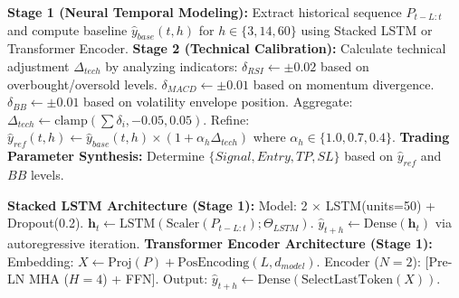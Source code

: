 \documentclass{ieeeaccess}
\begin{document}
\begin{itemize}
    \begin{breakablealgorithm}
    \caption{PricePredictor pipeline}
    \begin{algorithmic}[1]
    \STATE \textbf{Stage 1 (Neural Temporal Modeling):} 
    \STATE \quad Extract historical sequence $P_{t-L:t}$ and compute baseline $\hat{y}_{base}(t,h)$ for $h \in \{3,14,60\}$ using Stacked LSTM or Transformer Encoder.
    \STATE \textbf{Stage 2 (Technical Calibration):}
    \STATE \quad Calculate technical adjustment $\Delta_{tech}$ by analyzing indicators:
    \STATE \quad \hspace{0.5em} $\delta_{RSI} \gets \pm 0.02$ based on overbought/oversold levels.
    \STATE \quad \hspace{0.5em} $\delta_{MACD} \gets \pm 0.01$ based on momentum divergence.
    \STATE \quad \hspace{0.5em} $\delta_{BB} \gets \pm 0.01$ based on volatility envelope position.
    \STATE \quad Aggregate: $\Delta_{tech} \gets \text{clamp}(\sum \delta_i, -0.05, 0.05)$.
    \STATE \quad Refine: $\hat{y}_{ref}(t,h) \gets \hat{y}_{base}(t,h) \times (1 + \alpha_h \Delta_{tech})$ where $\alpha_h \in \{1.0, 0.7, 0.4\}$.
    \STATE \textbf{Trading Parameter Synthesis:}
    \STATE \quad Determine $\{Signal, Entry, TP, SL\}$ based on $\hat{y}_{ref}$ and $BB$ levels.
    \end{algorithmic}
    \end{breakablealgorithm}
    \vspace{-1.5em}
    \begin{breakablealgorithm}
    \caption{Neural foundation modules}
    \begin{algorithmic}[1]
    \STATE \textbf{Stacked LSTM Architecture (Stage 1):}
    \STATE \quad Model: 2 $\times$ LSTM(units=50) + Dropout(0.2).
    \STATE \quad $\mathbf{h}_t \gets \text{LSTM}(\text{Scaler}(P_{t-L:t}); \Theta_{LSTM})$.
    \STATE \quad $\hat{y}_{t+h} \gets \text{Dense}(\mathbf{h}_t)$ via autoregressive iteration.
    \STATE \textbf{Transformer Encoder Architecture (Stage 1):}
    \STATE \quad Embedding: $X \gets \text{Proj}(P) + \text{PosEncoding}(L, d_{model})$.
    \STATE \quad Encoder ($N=2$): [Pre-LN MHA ($H=4$) + FFN].
    \STATE \quad Output: $\hat{y}_{t+h} \gets \text{Dense}(\text{SelectLastToken}(X))$.
    \end{algorithmic}
    \end{breakablealgorithm}


\end{itemize}
\end{document}
